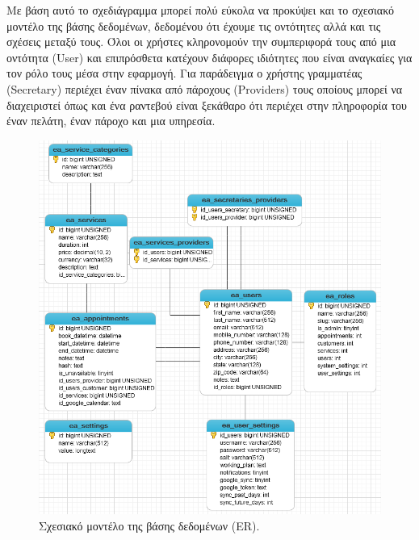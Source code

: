 Με βάση αυτό το σχεδιάγραμμα μπορεί πολύ εύκολα να προκύψει και το σχεσιακό μοντέλο της βάσης δεδομένων, δεδομένου ότι έχουμε τις οντότητες αλλά και τις σχέσεις μεταξύ τους. Όλοι οι χρήστες κληρονομούν την συμπεριφορά τους από μια οντότητα (User) και επιπρόσθετα κατέχουν διάφορες ιδιότητες που είναι αναγκαίες για τον ρόλο τους μέσα στην εφαρμογή. Για παράδειγμα ο χρήστης γραμματέας (Secretary) περιέχει έναν πίνακα από πάροχους (Providers) τους οποίους μπορεί να διαχειριστεί όπως και ένα ραντεβού είναι ξεκάθαρο ότι περιέχει στην πληροφορία του έναν πελάτη, έναν πάροχο και μια υπηρεσία.

\begin{figure}[ht!]
\centering
\includegraphics[width=160mm]{images/er.png}
\caption{Σχεσιακό μοντέλο της βάσης δεδομένων (ER).}
\label{er}
\end{figure}

